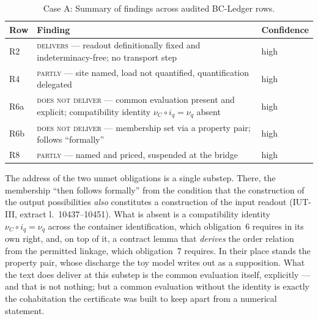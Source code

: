 \documentclass[11pt,a4paper]{article}
\theoremstyle{definition}
\newcommand{\anchor}[2]{(#1, extract l.~#2)}
\begin{document}
\begin{table}[htbp]
\centering
\small
\renewcommand{\arraystretch}{1.12}
\begin{tabular}{@{}lP{0.62\textwidth}l@{}}
\toprule
Row & Finding & Confidence \\
\midrule
R2 & \textsc{delivers} --- readout definitionally fixed and indeterminacy-free;
  no transport step & high \\
R4 & \textsc{partly} --- site named, load not quantified, quantification
  delegated & high \\
R6a & \textsc{does not deliver} --- common evaluation present and explicit;
  compatibility identity $\nu_C \circ i_q = \nu_q$ absent & high \\
R6b & \textsc{does not deliver} --- membership set via a property pair; follows
  ``formally'' & high \\
R8 & \textsc{partly} --- named and priced, suspended at the bridge & high \\
\bottomrule
\end{tabular}
\caption{Case A: Summary of findings across audited BC-Ledger rows.}
\label{tab:case_a_findings}
\end{table}

The address of the two unmet obligations is a single substep. There, the
membership ``then follows formally'' from the condition that the construction of
the output possibilities \emph{also} constitutes a construction of the input
readout \anchor{IUT-III}{10437--10451}. What is absent is a compatibility
identity $\nu_C \circ i_q = \nu_q$ across the container identification, which
obligation~6 requires in its own right, and, on top of it, a contract lemma that
\emph{derives} the order relation from the permitted linkage, which obligation~7
requires. In their place stands the property pair, whose discharge the toy model
writes out as a supposition. What the text does deliver at this substep is the
common evaluation itself, explicitly --- and that is not nothing; but a common
evaluation without the identity is exactly the cohabitation the certificate was
built to keep apart from a numerical statement.
\end{document}
